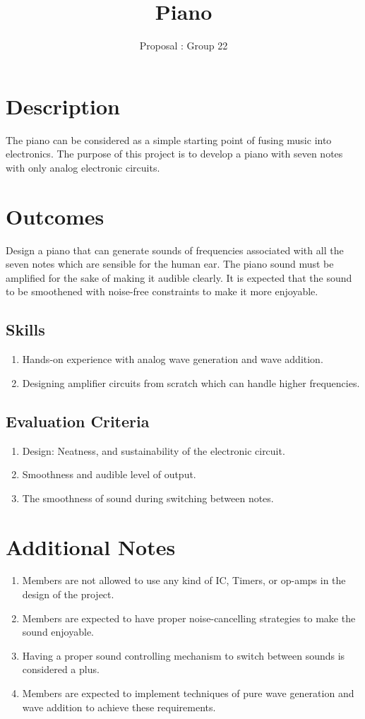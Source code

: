 \documentclass[11pt]{article}
\title{Piano}
\author{Proposal : Group 22 }
\date{}
\date{\vspace{-5ex}}
\begin{document}
\maketitle
\section*{Description}
The piano can be considered as a simple starting point of fusing music into electronics.
The purpose of this project is to develop a piano with seven notes with only analog
electronic circuits.

\section*{Outcomes}
Design a piano that can generate sounds of frequencies associated with all the seven notes which
are sensible for the human ear. The piano sound must be amplified for the sake of making
it audible clearly. It is expected that the sound to be smoothened with noise-free
constraints to make it more enjoyable.
\subsection*{Skills}
\begin{enumerate}
    \item Hands-on experience with analog wave generation and wave addition.
    \item Designing amplifier circuits from scratch which can handle higher frequencies.
\end{enumerate}
\subsection*{Evaluation Criteria}
\begin{enumerate}
    \item Design: Neatness, and sustainability of the electronic circuit.
    \item Smoothness and audible level of output.
    \item The smoothness of sound during switching between notes.
\end{enumerate}

\section*{Additional Notes}
\begin{enumerate}
    \item Members are not allowed to use any kind of IC, Timers, or op-amps in the design of the project.
    \item Members are expected to have proper noise-cancelling strategies to make the sound enjoyable.
    \item Having a proper sound controlling mechanism to switch between sounds is considered a plus.
    \item Members are expected to implement techniques of pure wave generation and wave addition to achieve these requirements.
\end{enumerate}
\end{document}
